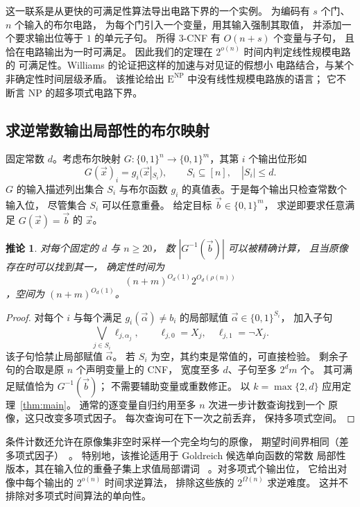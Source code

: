 \documentclass[11pt,reqno]{amsart}
\numberwithin{equation}{section}
\newtheorem{corollary}[theorem]{推论}
\theoremstyle{definition}\newtheorem{definition}[theorem]{定义}
\theoremstyle{remark}\newtheorem{remark}[theorem]{注}
\renewcommand{\le}{\leqslant}
\renewcommand{\ge}{\geqslant}
\begin{document}
这一联系是从更快的可满足性算法导出电路下界的一个实例。
为编码有 $s$ 个门、$n$ 个输入的布尔电路，
为每个门引入一个变量，用其输入强制其取值，
并添加一个要求输出位等于 $1$ 的单元子句。
所得 $3$-CNF 有 $O(n+s)$ 个变量与子句，
且恰在电路输出为一时可满足。
因此我们的定理在 $2^{o(n)}$ 时间内判定线性规模电路的
可满足性。Williams 的论证把这样的加速与对见证的假想小
电路结合，与某个非确定性时间层级矛盾。
该推论给出 $\mathrm E^{\mathrm{NP}}$
中没有线性规模电路族的语言；
它不断言 NP 的超多项式电路下界。



\subsection{求逆常数输出局部性的布尔映射}\label{subsec:local-inversion}
固定常数 $d$。考虑布尔映射
$G:\{0,1\}^n\to\{0,1\}^m$，其第 $i$ 个输出位形如
\[
 G(\vec{x})_i=g_i(\vec{x}|_{S_i}),
 \qquad S_i\subseteq[n],\quad |S_i|\le d.
\]
$G$ 的输入描述列出集合 $S_i$ 与布尔函数 $g_i$
的真值表。于是每个输出只检查常数个输入位，
尽管集合 $S_i$ 可以任意重叠。
给定目标 $\vec{b}\in\{0,1\}^m$，
求逆即要求任意满足 $G(\vec{x})=\vec{b}$
的 $\vec{x}$。

\begin{corollary}\label{cor:consequence-local-inversion}
对每个固定的 $d$ 与 $n\ge20$，
数 $|G^{-1}(\vec{b})|$ 可以被精确计算，
且当原像存在时可以找到其一，
确定性时间为
\[
 (n+m)^{O_d(1)}2^{O_d(\rho(n))}
\]
，空间为 $(n+m)^{O_d(1)}$。
\end{corollary}
\begin{proof}
对每个 $i$ 与每个满足 $g_i(\vec{\alpha})\ne b_i$
的局部赋值 $\vec{\alpha}\in\{0,1\}^{S_i}$，
加入子句
\[
 \bigvee_{j\in S_i}\ell_{j,\alpha_j},
 \qquad
 \ell_{j,0}=X_j,\quad \ell_{j,1}=\neg X_j.
\]
该子句恰禁止局部赋值 $\vec{\alpha}$。
若 $S_i$ 为空，其约束是常值的，可直接检验。
剩余子句的合取是原 $n$ 个声明变量上的 CNF，
宽度至多 $d$、子句至多 $2^d m$ 个。
其可满足赋值恰为 $G^{-1}(\vec{b})$；
不需要辅助变量或重数修正。
以 $k=\max\{2,d\}$ 应用定理~\ref{thm:main}。
通常的逐变量自归约用至多 $n$ 次进一步计数查询找到一个
原像，这只改变多项式因子。
每次查询可在下一次之前丢弃，
保持多项式空间。
\end{proof}

条件计数还允许在原像集非空时采样一个完全均匀的原像，
期望时间界相同（差多项式因子）~\cite{JVV86}。
特别地，该推论适用于 Goldreich 候选单向函数的常数
局部性版本，其在输入位的重叠子集上求值局部谓词
~\cite{Gol00}。对多项式个输出位，
它给出对像中每个输出的 $2^{o(n)}$ 时间求逆算法，
排除这些族的 $2^{\Omega(n)}$ 求逆难度。
这并不排除对多项式时间算法的单向性。
\end{document}
